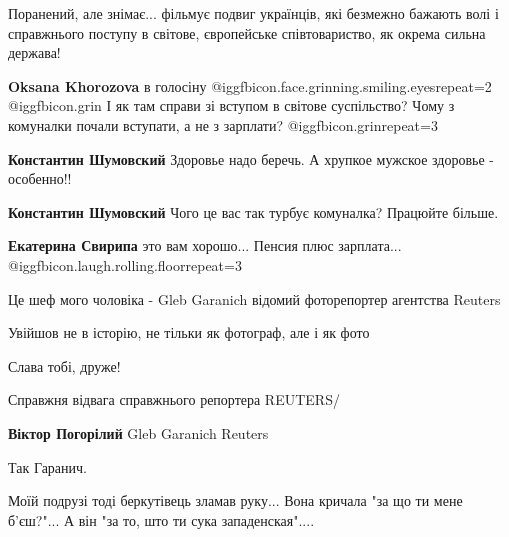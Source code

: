  
 
 
 
 


Поранений, але знімає... фільмує подвиг українців, які безмежно бажають волі і
справжнього поступу в світове, європейське співтовариство, як окрема сильна
держава!

\textbf{Oksana Khorozova} в голосіну @igg{fbicon.face.grinning.smiling.eyes}{repeat=2}  @igg{fbicon.grin} 
І як там справи зі вступом в світове суспільство?
Чому з комуналки почали вступати, а не з зарплати? @igg{fbicon.grin}{repeat=3} 

\textbf{Константин Шумовский} Здоровье надо беречь. А хрупкое мужское здоровье - особенно!!

\textbf{Константин Шумовский} Чого це вас так турбує комуналка? Працюйте більше.

\textbf{Екатерина Свирипа} это вам хорошо... Пенсия плюс зарплата...  @igg{fbicon.laugh.rolling.floor}{repeat=3} 


Це шеф мого чоловіка - Gleb Garanich відомий фоторепортер агентства Reuters

Увійшов не в історію, не тільки як фотограф, але і як фото

Слава тобі, друже!

Справжня відвага справжнього репортера REUTERS/

\textbf{Віктор Погорілий} Gleb Garanich Reuters

Так Гаранич.


Моїй подрузі тоді беркутівець зламав руку... Вона кричала "за що ти мене
б'єш?"... А він "за то, што ти сука западенская"....

